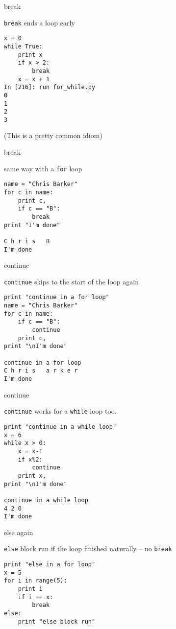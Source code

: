 \documentclass{beamer}
\begin{document}
\begin{frame}[fragile]{break}

{\Large \verb|break| ends a loop early}

\begin{verbatim}
x = 0
while True:
    print x
    if x > 2:
        break
    x = x + 1
In [216]: run for_while.py
0
1
2
3
\end{verbatim}

\vfill
(This is a pretty common idiom)

\end{frame}

\begin{frame}[fragile]{break}

{\Large same way with a \verb|for| loop }

\begin{verbatim}
name = "Chris Barker"
for c in name:
    print c,
    if c == "B":
        break
print "I'm done"

C h r i s   B 
I'm done
\end{verbatim}
\end{frame}

\begin{frame}[fragile]{continue}

{\Large \verb|continue| skips to the start of the loop again}

\begin{verbatim}
print "continue in a for loop"
name = "Chris Barker"
for c in name:
    if c == "B":
        continue
    print c,
print "\nI'm done"

continue in a for loop
C h r i s   a r k e r 
I'm done
\end{verbatim}
\end{frame}

\begin{frame}[fragile]{continue}

{\Large \verb|continue| works for a \verb|while| loop too.}

\begin{verbatim}
print "continue in a while loop"
x = 6
while x > 0:
    x = x-1
    if x%2:
        continue
    print x,
print "\nI'm done"

continue in a while loop
4 2 0 
I'm done
\end{verbatim}
\end{frame}

\begin{frame}[fragile]{else again}

{\Large \verb|else| block run if the loop finished naturally -- no \verb|break|}

\begin{verbatim}
print "else in a for loop"
x = 5
for i in range(5):
    print i
    if i == x:
        break
else:
    print "else block run"

\end{verbatim}
\end{frame}
\end{document}
